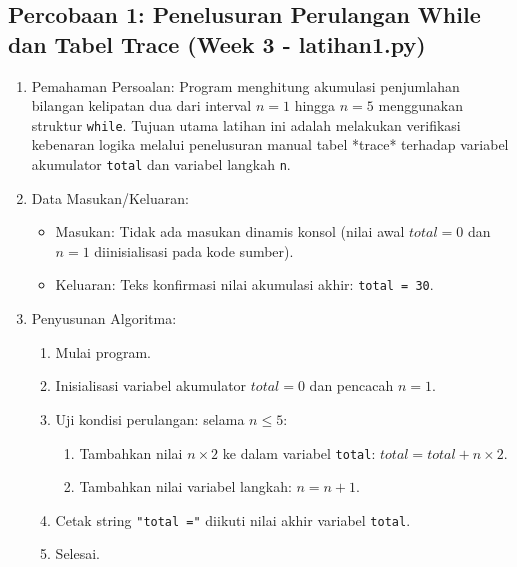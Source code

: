 \documentclass[12pt,a4paper]{article}
\begin{document}
\subsection{Percobaan 1: Penelusuran Perulangan While dan Tabel Trace (Week 3 - latihan1.py)}
\begin{enumerate}
    \item Pemahaman Persoalan: Program menghitung akumulasi penjumlahan bilangan kelipatan dua dari interval $n = 1$ hingga $n = 5$ menggunakan struktur \texttt{while}. Tujuan utama latihan ini adalah melakukan verifikasi kebenaran logika melalui penelusuran manual tabel *trace* terhadap variabel akumulator \texttt{total} dan variabel langkah \texttt{n}.
    \item Data Masukan/Keluaran:
    \begin{itemize}
        \item Masukan: Tidak ada masukan dinamis konsol (nilai awal $total=0$ dan $n=1$ diinisialisasi pada kode sumber).
        \item Keluaran: Teks konfirmasi nilai akumulasi akhir: \texttt{total = 30}.
    \end{itemize}
    \item Penyusunan Algoritma:
    \begin{enumerate}[label=\alph*.]
        \item Mulai program.
        \item Inisialisasi variabel akumulator $total = 0$ dan pencacah $n = 1$.
        \item Uji kondisi perulangan: selama $n \le 5$:
        \begin{enumerate}[label=\roman*.]
            \item Tambahkan nilai $n \times 2$ ke dalam variabel \texttt{total}: $total = total + n \times 2$.
            \item Tambahkan nilai variabel langkah: $n = n + 1$.
        \end{enumerate}
        \item Cetak string \texttt{"total ="} diikuti nilai akhir variabel \texttt{total}.
        \item Selesai.
    \end{enumerate}
\end{enumerate}
\end{document}
